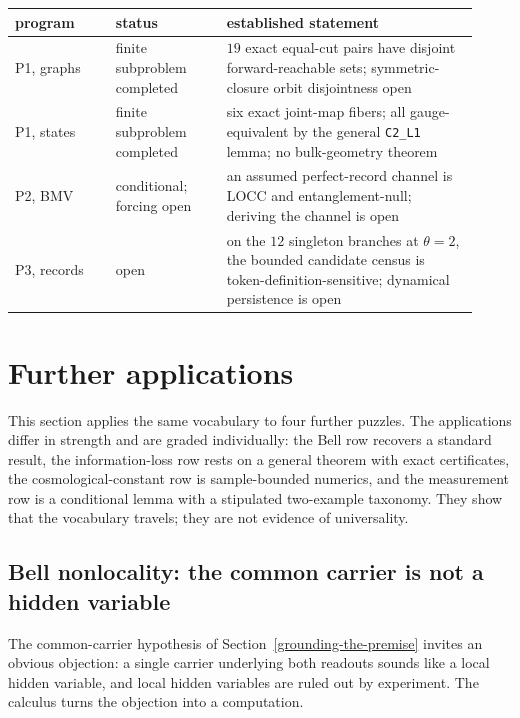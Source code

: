 \documentclass[11pt]{article}
\theoremstyle{definition}
\begin{document}
\begin{center}
\small
\begin{longtable}[]{@{}p{0.2\linewidth}p{0.22\linewidth}p{0.5\linewidth}@{}}
\toprule
program & status & established statement\\
\midrule
\endhead
P1, graphs & finite subproblem completed & \(19\) exact equal-cut pairs have disjoint forward-reachable sets; symmetric-closure
orbit disjointness open\\
P1, states & finite subproblem completed & six exact joint-map fibers; all gauge-equivalent by the general
\texttt{C2\_L1} lemma; no bulk-geometry theorem\\
P2, BMV & conditional; forcing open & an assumed perfect-record channel is LOCC and entanglement-null; deriving the
channel is open\\
P3, records & open & on the \(12\) singleton branches at \(\theta=2\), the bounded candidate census is
token-definition-sensitive; dynamical persistence is open\\
\bottomrule
\end{longtable}
\end{center}
 \section{Further applications}\label{breadth-one-calculus-three-more-deep-problems}

This section applies the same vocabulary to four further puzzles. The applications differ in strength and are graded
individually: the Bell row recovers a standard result, the information-loss row rests on a general theorem with exact
certificates, the cosmological-constant row is sample-bounded numerics, and the measurement row is a conditional lemma
with a stipulated two-example taxonomy. They show that the vocabulary travels; they are not evidence of universality.

\subsection{Bell nonlocality: the common carrier is not a hidden variable}\label{bell-nonlocality-the-common-carrier-is-not-a-hidden-variable}

The common-carrier hypothesis of Section~\ref{grounding-the-premise} invites an obvious objection: a single carrier
underlying both readouts sounds like a local hidden variable, and local hidden variables are ruled out by
experiment. The calculus turns the objection into a computation.
\end{document}

